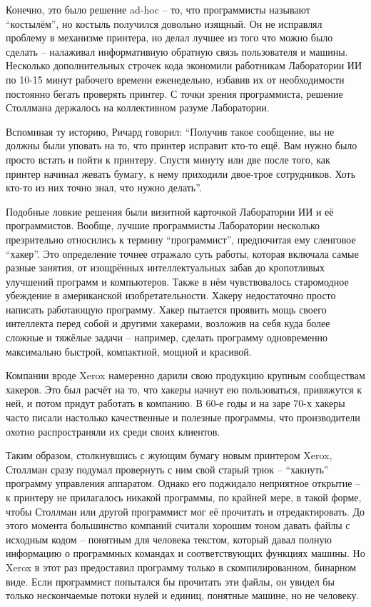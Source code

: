 Конечно, это было решение ad-hoc -- то, что программисты называют \enquote{костылём}, но костыль получился довольно изящный. Он не исправлял проблему в механизме принтера, но делал лучшее из того что можно было сделать -- налаживал информативную обратную связь пользователя и машины. Несколько дополнительных строчек кода экономили работникам Лаборатории ИИ по 10-15 минут рабочего времени еженедельно, избавив их от необходимости постоянно бегать проверять принтер. С точки зрения программиста, решение Столлмана держалось на коллективном разуме Лаборатории.

Вспоминая ту историю, Ричард говорил: \enquote{Получив такое сообщение, вы не должны были уповать на то, что принтер исправит кто-то ещё. Вам нужно было просто встать и пойти к принтеру. Спустя минуту или две после того, как принтер начинал жевать бумагу, к нему приходили двое-трое сотрудников. Хоть кто-то из них точно знал, что нужно делать}.

Подобные ловкие решения были визитной карточкой Лаборатории ИИ и её программистов. Вообще, лучшие программисты Лаборатории несколько презрительно относились к термину \enquote{программист}, предпочитая ему сленговое \enquote{хакер}. Это определение точнее отражало суть работы, которая включала самые разные занятия, от изощрённых интеллектуальных забав до кропотливых улучшений программ и компьютеров. Также в нём чувствовалось старомодное убеждение в американской изобретательности. Хакеру недостаточно просто написать работающую программу. Хакер пытается проявить мощь своего интеллекта перед собой и другими хакерами, возложив на себя куда более сложные и тяжёлые задачи -- например, сделать программу одновременно максимально быстрой, компактной, мощной и красивой.

Компании вроде Xerox намеренно дарили свою продукцию крупным сообществам хакеров. Это был расчёт на то, что хакеры начнут ею пользоваться, привяжутся к ней, и потом придут работать в компанию. В 60-е годы и на заре 70-х хакеры часто писали настолько качественные и полезные программы, что производители охотно распространяли их среди своих клиентов.

Таким образом, столкнувшись с жующим бумагу новым принтером Xerox, Столлман сразу подумал провернуть с ним свой старый трюк -- \enquote{хакнуть} программу управления аппаратом. Однако его поджидало неприятное открытие -- к принтеру не прилагалось никакой программы, по крайней мере, в такой форме, чтобы Столлман или другой программист мог её прочитать и отредактировать. До этого момента большинство компаний считали хорошим тоном давать файлы с исходным кодом -- понятным для человека текстом, который давал полную информацию о программных командах и соответствующих функциях машины. Но Xerox в этот раз предоставил программу только в скомпилированном, бинарном виде. Если программист попытался бы прочитать эти файлы, он увидел бы только нескончаемые потоки нулей и единиц, понятные машине, но не человеку.

